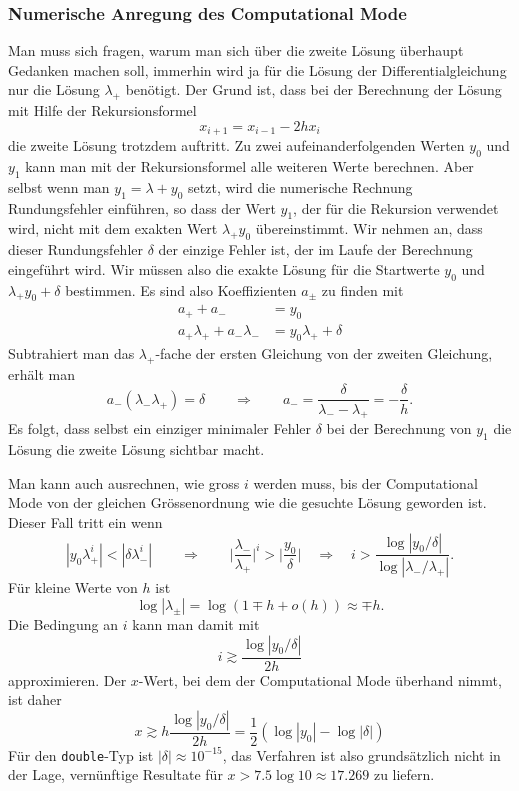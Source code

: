 \subsubsection{Numerische Anregung des Computational Mode}
%
Man muss sich fragen, warum man sich über die zweite Lösung überhaupt
Gedanken machen soll, immerhin wird ja für die Lösung der
Differentialgleichung nur die Lösung $\lambda_+$ benötigt.
Der Grund ist, dass bei der Berechnung der Lösung mit Hilfe der
Rekursionsformel
\[
x_{i+1} = x_{i-1}-2hx_i
\]
die zweite Lösung trotzdem auftritt.
Zu zwei aufeinanderfolgenden Werten $y_0$ und $y_1$ kann man mit der
Rekursionsformel alle weiteren Werte berechnen.
Aber selbst wenn man $y_1 = \lambda+y_0$ setzt, wird die numerische
Rechnung Rundungsfehler einführen, so dass der Wert $y_1$, der für die
Rekursion verwendet wird, nicht mit dem exakten Wert $\lambda_+y_0$
übereinstimmt.
%
Wir nehmen an, dass dieser Rundungsfehler $\delta$ der einzige
Fehler ist, der im Laufe der Berechnung eingeführt wird.
%
Wir müssen also die exakte Lösung für die Startwerte $y_0$ und
$\lambda_+y_0+\delta$ bestimmen.
Es sind also Koeffizienten $a_\pm$ zu finden mit
\begin{align*}
a_+ + a_- &= y_0 \\
a_+\lambda_+ + a_-\lambda_-&=y_0\lambda_++\delta
\end{align*}
Subtrahiert man das $\lambda_+$-fache der ersten Gleichung von der
zweiten Gleichung, erhält man
\[
a_-(\lambda_-\lambda_+)=\delta
\qquad\Rightarrow\qquad
a_- = \frac{\delta}{\lambda_--\lambda_+} = -\frac{\delta}{h}.
\]
Es folgt, dass selbst ein einziger minimaler Fehler $\delta$
bei der Berechnung von $y_1$ die Lösung die zweite Lösung sichtbar
macht. 

Man kann auch ausrechnen, wie gross $i$ werden muss, bis der
Computational Mode von der gleichen Grössenordnung wie die
gesuchte Lösung geworden ist.
Dieser Fall tritt ein wenn
\[
|y_0\lambda_+^i| < |\delta\lambda_-^i|
\qquad\Rightarrow\qquad
\biggl|
\frac{\lambda_-}{\lambda_+}
\biggr|^i
> \biggl|\frac{y_0}{\delta}\biggr|
\quad\Rightarrow\quad
i
>
\frac{\log |y_0/\delta|}{\log|\lambda_-/\lambda_+|}.
\]
Für kleine Werte von $h$ ist
\[
\log |\lambda_\pm|
=
\log(1\mp h+o(h)) 
\approx
\mp h.
\]
Die Bedingung an $i$ kann man damit mit
\[
i \gtrsim \frac{\log |y_0/\delta|}{2h}
\]
approximieren.
Der $x$-Wert, bei dem der Computational Mode überhand nimmt, ist daher
\[
x \gtrsim h \frac{\log|y_0/\delta|}{2h} = \frac12(\log|y_0|-\log|\delta|)
\]
Für den \texttt{double}-Typ ist $|\delta| \approx 10^{-15}$,
das Verfahren ist also grundsätzlich nicht in der Lage, vernünftige
Resultate für $x>7.5\log 10\approx 17.269$ zu liefern.

